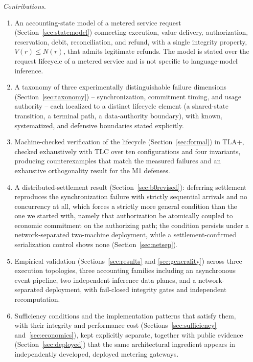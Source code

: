 \documentclass[final,5p,times,twocolumn,number]{elsarticle}
\begin{document}
\textit{Contributions.}
\begin{enumerate}
\item An accounting-state model of a metered service request
(Section~\ref{sec:statemodel}) connecting execution, value delivery, authorization,
reservation, debit, reconciliation, and refund, with a single integrity property,
$V(r) \le N(r)$, that admits legitimate refunds. The model is stated over the request
lifecycle of a metered service and is not specific to language-model inference.
\item A taxonomy of three experimentally distinguishable failure dimensions
(Section~\ref{sec:taxonomy}) -- synchronization, commitment timing, and usage authority --
each localized to a distinct lifecycle element (a shared-state transition, a terminal
path, a data-authority boundary), with known, systematized, and defensive boundaries
stated explicitly.
\item Machine-checked verification of the lifecycle (Section~\ref{sec:formal}) in TLA+,
checked exhaustively with TLC over ten configurations and four invariants, producing
counterexamples that match the measured failures and an exhaustive orthogonality result
for the M1 defenses.
\item A distributed-settlement result (Section~\ref{sec:b0revised}): deferring settlement
reproduces the synchronization failure with strictly sequential arrivals and no
concurrency at all, which forces a strictly more general condition than the one we
started with, namely that authorization be atomically coupled to economic commitment on
the authorizing path; the condition persists under a network-separated two-machine
deployment, while a settlement-confirmed serialization control shows none
(Section~\ref{sec:netsep}).
\item Empirical validation (Sections~\ref{sec:results} and \ref{sec:generality}) across
three execution topologies, three accounting families including an asynchronous event
pipeline, two independent inference data planes, and a network-separated deployment, with
fail-closed integrity gates and independent recomputation.
\item Sufficiency conditions and the implementation patterns that satisfy them, with
their integrity and performance cost (Sections~\ref{sec:sufficiency}
and~\ref{sec:economics}), kept explicitly separate, together with
public evidence (Section~\ref{sec:deployed}) that the same architectural ingredient
appears in independently developed, deployed metering gateways.
\end{enumerate}
\end{document}
